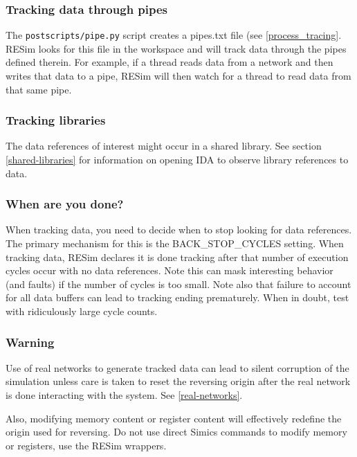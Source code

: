 \documentclass[titlepage]{article}
\begin{document}
\subsubsection{Tracking data through pipes}
The {\tt postscripts/pipe.py} script creates a pipes.txt file (see \ref{process_tracing}.   RESim looks for this file in the workspace and will track data through the
pipes defined therein.  For example, if a thread reads data from a network and then writes that data to a pipe, RESim will then watch for a thread
to read data from that same pipe.

\subsubsection{Tracking libraries}
The data references of interest might occur in a shared library.  See section \ref{shared-libraries} for information on opening IDA to 
observe library references to data.

\subsubsection{When are you done?}
When tracking data, you need to decide when to stop looking for data references.  The primary mechanism for this is the BACK\_STOP\_CYCLES
setting.  When tracking data, RESim declares it is done tracking after that number of execution cycles occur with no data references.
Note this can mask interesting behavior (and faults) if the number of cycles is too small.  Note also that failure to account for all data
buffers can lead to tracking ending prematurely.  When in doubt, test with ridiculously large cycle counts.

\subsubsection{Warning}
Use of real networks to generate tracked data can lead to silent corruption of the simulation unless care is taken to reset the reversing origin
after the real network is done interacting with the system.  See \ref{real-networks}.

Also, modifying memory content or register content will effectively redefine the origin used for reversing.  Do not use direct Simics commands to modify 
memory or registers, use the RESim wrappers.
\end{document}
